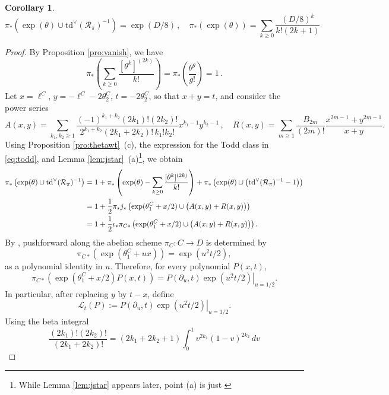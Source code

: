 \documentclass[11pt]{article}
\def\Td{\mathrm{td}}
\def\cR{\mathcal{R}}
\theoremstyle{definition}
\newtheorem{corollary}[definition]{Corollary}
\begin{document}
\begin{corollary}\label{cor:pushThet}
    $$
    \pi_*(\exp(\theta)\cup\Td^\vee(\cR_\pi)^{-1}) = \exp(D/8)\, , \quad \pi_*(\exp(\theta)) = \sum_{k \geq 0} \frac{(D/8)^{k}}{k!(2k+1)}
    $$
\end{corollary}
\begin{proof}
    By Proposition \ref{pro:vanish}, we have
    \[
    \pi_*\left(\sum_{k\geq0}\frac{[\theta^k]^{(2k)}}{k!}\right)=\pi_*\left(\frac{\theta^g}{g!}\right)=1\, .
    \]
    Let $x=\ell^C$, $y=-\ell^C-2\theta_2^C$, $t=-2\theta_2^C$,
    so that \(x+y=t\), and consider the power series
    \[
    A(x,y)=\sum_{k_1,k_2\geq1}\frac{(-1)^{k_1+k_2}(2k_1)!(2k_2)!}{2^{k_1+k_2}(2k_1+2k_2)!\,k_1!k_2!}x^{k_1-1}y^{k_2-1}\, ,\quad
    R(x,y)=\sum_{m\geq1}\frac{B_{2m}}{(2m)!}\frac{x^{2m-1}+y^{2m-1}}{x+y}.
    \]
    Using Proposition \ref{pro:thetawt}~(c), the expression for the
    Todd class in \eqref{eq:todd}, and Lemma \ref{lem:jstar}~(a)\footnote{While Lemma \ref{lem:jstar} appears later, point (a) is just \cite[Corollary 4.6]{EGH10}}, we obtain
    \begin{align*}
        \pi_*\left(\exp(\theta)\cup\Td^\vee(\cR_\pi)^{-1}\right)
        ={}&
        1+
        \pi_*\left(
        \exp(\theta)
        -
        \sum_{k\geq0}\frac{[\theta^k]^{(2k)}}{k!}
        \right) +
        \pi_*\left(
        \exp(\theta)\cup
        \left(\Td^\vee(\cR_\pi)^{-1}-1\right)
        \right) \notag\\
        ={}&
        1+\frac12\pi_*j_*\left(
        \exp(\theta_1^C+x/2)\cup
        \bigl(A(x,y)+R(x,y)\bigr)
        \right) \notag\\
        ={}&
        1+\frac12\iota_*\pi_{C*}\left(
        \exp(\theta_1^C+x/2)\cup
        \bigl(A(x,y)+R(x,y)\bigr)
        \right).
    \end{align*}
    By \cite[Theorem 9.10]{BMP}, pushforward along the abelian scheme
    \(\pi_C\colon C\to D\) is determined by
    \[
    \pi_{C*}\left(\exp(\theta_1^C+ux)\right)
    =
    \exp(u^2t/2),
    \]
    as a polynomial identity in \(u\). Therefore, for every polynomial
    \(P(x,t)\),
    \[
    \pi_{C*}\left(
    \exp(\theta_1^C+x/2)P(x,t)
    \right)
    =
    \left.
    P(\partial_u,t)\exp(u^2t/2)
    \right|_{u=1/2}.
    \]
    In particular, after replacing \(y\) by \(t-x\), define
    \[
    \mathcal L_t(P)
    :=
    \left.
    P(\partial_u,t)\exp(u^2t/2)
    \right|_{u=1/2}.
    \]
    Using the beta integral
    \[
    \frac{(2k_1)!(2k_2)!}{(2k_1+2k_2)!}
    =
    (2k_1+2k_2+1)
    \int_0^1v^{2k_1}(1-v)^{2k_2}\,dv
\]
\end{proof}
\end{document}
